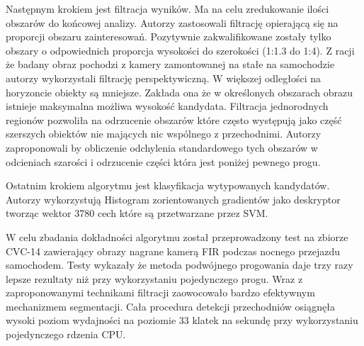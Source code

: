 Następnym krokiem jest filtracja wyników. Ma na celu zredukowanie ilości obszarów do końcowej analizy. Autorzy zastosowali filtrację opierającą się na proporcji obszaru zainteresowań. Pozytywnie zakwalifikowane zostały tylko obszary o odpowiednich proporcja wysokości do szerokości (1:1.3 do 1:4). Z racji że badany obraz pochodzi z kamery zamontowanej na stałe na samochodzie autorzy wykorzystali filtrację perspektywiczną. W większej odległości na horyzoncie obiekty są mniejsze. Zakłada ona że w określonych obszarach obrazu istnieje maksymalna możliwa wysokość kandydata. Filtracja jednorodnych regionów pozwoliła na odrzucenie obszarów które często występują jako część szerszych obiektów nie mających nic wspólnego z przechodnimi. Autorzy zaproponowali by obliczenie odchylenia standardowego tych obszarów w odcieniach szarości i odrzucenie części która jest poniżej pewnego progu. 

Ostatnim krokiem algorytmu jest klasyfikacja wytypowanych kandydatów. Autorzy wykorzystują Histogram zorientowanych gradientów jako deskryptor tworząc wektor 3780 cech które są przetwarzane przez SVM.

W celu zbadania dokładności algorytmu został przeprowadzony test na zbiorze CVC-14 zawierający obrazy nagrane kamerą FIR podczas nocnego przejazdu samochodem. Testy wykazały że metoda podwójnego progowania daje trzy razy lepsze rezultaty niż przy wykorzystaniu pojedynczego progu. Wraz z zaproponowanymi technikami filtracji zaowocowało bardzo efektywnym mechanizmem segmentacji. Cała procedura detekcji przechodniów osiągnęła wysoki poziom wydajności na poziomie 33 klatek na sekundę przy wykorzystaniu pojedynczego rdzenia CPU.


